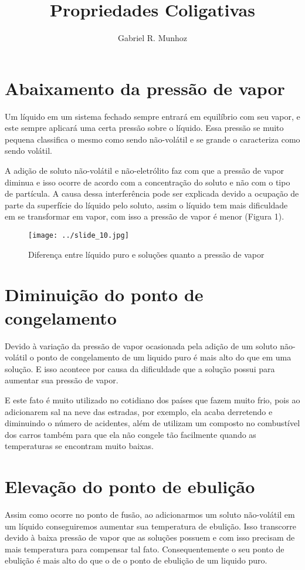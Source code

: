 \documentclass[a4paper,,12pt]{abntex2}
\author{Gabriel R. Munhoz}
\title{Propriedades Coligativas}
\begin{document}
\maketitle
\section{Abaixamento da pressão de vapor}

Um líquido em um sistema fechado sempre entrará em equilíbrio com seu vapor, e este sempre aplicará uma certa pressão sobre o líquido. Essa pressão se muito pequena classifica o mesmo como sendo não-volátil e se grande o caracteriza como sendo volátil.

A adição de soluto não-volátil e não-eletrólito faz com que a pressão de vapor diminua e isso ocorre de acordo com a concentração do soluto e não com o tipo de partícula. A causa dessa interferência pode ser explicada devido a ocupação de parte da superfície do líquido pelo soluto, assim o líquido tem mais dificuldade em se transformar em vapor, com isso a pressão de vapor é menor (Figura 1).

\begin{figure}[!htp]
\centering
\texttt{[image: ../slide\_10.jpg]}  
\caption{Diferença entre líquido puro e soluções quanto a pressão de vapor}
\end{figure}

\section{Diminuição do ponto de congelamento}

Devido à variação da pressão de vapor ocasionada pela adição de um soluto não-volátil o ponto de congelamento de um liquido puro é mais alto do que em uma solução. E isso acontece por causa da dificuldade que a solução possui para aumentar sua pressão de vapor.

E este fato é muito utilizado no cotidiano dos países que fazem muito frio, pois ao adicionarem sal na neve das estradas, por exemplo, ela acaba derretendo e diminuindo o número de acidentes, além de utilizam um composto no combustível dos carros também para que ela não congele tão facilmente quando as temperaturas se encontram muito baixas.

\section{Elevação do ponto de ebulição}
Assim como ocorre no ponto de fusão, ao adicionarmos um soluto não-volátil em um líquido conseguiremos aumentar sua temperatura de ebulição. Isso transcorre devido à baixa pressão de vapor que as soluções possuem e com isso precisam de mais temperatura para compensar tal fato. Consequentemente o seu ponto de ebulição é mais alto do que o de o ponto de ebulição de um liquido puro.
\end{document}
